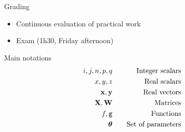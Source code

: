 \documentclass[xcolor=pdftex,dvipsnames,table,mathserif]{beamer}
\begin{document}


\begin{frame}{Grading}

\begin{itemize}
\item Continuous evaluation of practical work
\item Exam (1h30, Friday afternoon)
\end{itemize}

\end{frame}

\begin{frame}{Main notations}
  \begin{eqnarray*}
    i, j, n, p, q & \hspace{1em} & \text{Integer scalars} \\
    x, y, z & \hspace{1em} & \text{Real scalars} \\
    \mathbf{x}, \mathbf{y} & \hspace{1em} & \text{Real vectors} \\
    \mathbf{X}, \mathbf{W} & \hspace{1em} & \text{Matrices} \\
    f, \texttt{g} & \hspace{1em} & \text{Functions} \\
    \boldsymbol{\theta} & \hspace{1em} & \text{Set of parameters} \\
    \end{eqnarray*}
\end{frame}











\end{document}
